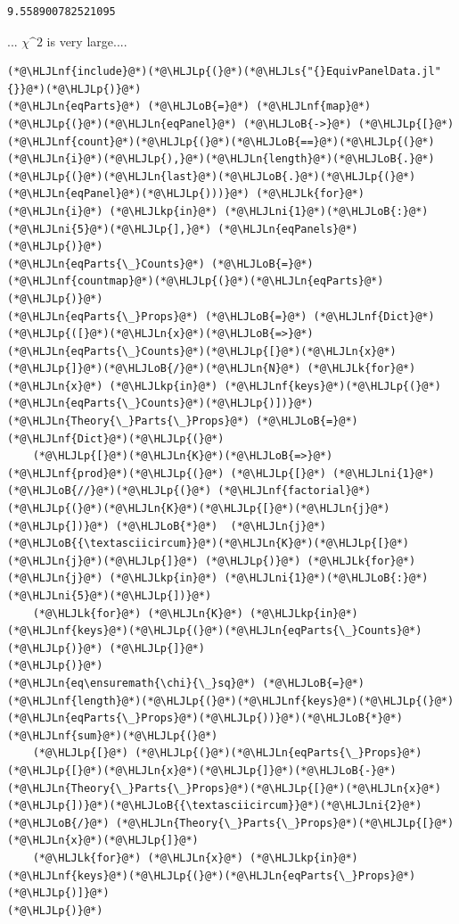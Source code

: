 \documentclass[12pt,a4paper]{article}
\newcommand{\HLJLk}[1]{\textcolor[RGB]{148,91,176}{\textbf{#1}}}
\newcommand{\HLJLkp}[1]{\textcolor[RGB]{148,91,176}{\textbf{#1}}}
\newcommand{\HLJLn}[1]{#1}
\newcommand{\HLJLnf}[1]{\textcolor[RGB]{66,102,213}{#1}}
\newcommand{\HLJLs}[1]{\textcolor[RGB]{201,61,57}{#1}}
\newcommand{\HLJLni}[1]{\textcolor[RGB]{59,151,46}{#1}}
\newcommand{\HLJLoB}[1]{\textcolor[RGB]{102,102,102}{\textbf{#1}}}
\newcommand{\HLJLp}[1]{#1}
\begin{document}
\begin{lstlisting}
9.558900782521095
\end{lstlisting}


... \ensuremath{\chi}\ensuremath{\^2} is very large....


\begin{lstlisting}
(*@\HLJLnf{include}@*)(*@\HLJLp{(}@*)(*@\HLJLs{"{}EquivPanelData.jl"{}}@*)(*@\HLJLp{)}@*)
(*@\HLJLn{eqParts}@*) (*@\HLJLoB{=}@*) (*@\HLJLnf{map}@*)(*@\HLJLp{(}@*)(*@\HLJLn{eqPanel}@*) (*@\HLJLoB{->}@*) (*@\HLJLp{[}@*)(*@\HLJLnf{count}@*)(*@\HLJLp{(}@*)(*@\HLJLoB{==}@*)(*@\HLJLp{(}@*)(*@\HLJLn{i}@*)(*@\HLJLp{),}@*)(*@\HLJLn{length}@*)(*@\HLJLoB{.}@*)(*@\HLJLp{(}@*)(*@\HLJLn{last}@*)(*@\HLJLoB{.}@*)(*@\HLJLp{(}@*)(*@\HLJLn{eqPanel}@*)(*@\HLJLp{)))}@*) (*@\HLJLk{for}@*) (*@\HLJLn{i}@*) (*@\HLJLkp{in}@*) (*@\HLJLni{1}@*)(*@\HLJLoB{:}@*)(*@\HLJLni{5}@*)(*@\HLJLp{],}@*) (*@\HLJLn{eqPanels}@*) (*@\HLJLp{)}@*)
(*@\HLJLn{eqParts{\_}Counts}@*) (*@\HLJLoB{=}@*) (*@\HLJLnf{countmap}@*)(*@\HLJLp{(}@*)(*@\HLJLn{eqParts}@*)(*@\HLJLp{)}@*)
(*@\HLJLn{eqParts{\_}Props}@*) (*@\HLJLoB{=}@*) (*@\HLJLnf{Dict}@*)(*@\HLJLp{([}@*)(*@\HLJLn{x}@*)(*@\HLJLoB{=>}@*)(*@\HLJLn{eqParts{\_}Counts}@*)(*@\HLJLp{[}@*)(*@\HLJLn{x}@*)(*@\HLJLp{]}@*)(*@\HLJLoB{/}@*)(*@\HLJLn{N}@*) (*@\HLJLk{for}@*) (*@\HLJLn{x}@*) (*@\HLJLkp{in}@*) (*@\HLJLnf{keys}@*)(*@\HLJLp{(}@*)(*@\HLJLn{eqParts{\_}Counts}@*)(*@\HLJLp{)])}@*)
(*@\HLJLn{Theory{\_}Parts{\_}Props}@*) (*@\HLJLoB{=}@*) (*@\HLJLnf{Dict}@*)(*@\HLJLp{(}@*)
	(*@\HLJLp{[}@*)(*@\HLJLn{K}@*)(*@\HLJLoB{=>}@*) (*@\HLJLnf{prod}@*)(*@\HLJLp{(}@*) (*@\HLJLp{[}@*) (*@\HLJLni{1}@*)(*@\HLJLoB{//}@*)(*@\HLJLp{(}@*) (*@\HLJLnf{factorial}@*)(*@\HLJLp{(}@*)(*@\HLJLn{K}@*)(*@\HLJLp{[}@*)(*@\HLJLn{j}@*)(*@\HLJLp{])}@*) (*@\HLJLoB{*}@*)  (*@\HLJLn{j}@*)(*@\HLJLoB{{\textasciicircum}}@*)(*@\HLJLn{K}@*)(*@\HLJLp{[}@*)(*@\HLJLn{j}@*)(*@\HLJLp{]}@*) (*@\HLJLp{)}@*) (*@\HLJLk{for}@*) (*@\HLJLn{j}@*) (*@\HLJLkp{in}@*) (*@\HLJLni{1}@*)(*@\HLJLoB{:}@*)(*@\HLJLni{5}@*)(*@\HLJLp{])}@*) 
	(*@\HLJLk{for}@*) (*@\HLJLn{K}@*) (*@\HLJLkp{in}@*) (*@\HLJLnf{keys}@*)(*@\HLJLp{(}@*)(*@\HLJLn{eqParts{\_}Counts}@*)(*@\HLJLp{)}@*) (*@\HLJLp{]}@*)
(*@\HLJLp{)}@*)
(*@\HLJLn{eq\ensuremath{\chi}{\_}sq}@*) (*@\HLJLoB{=}@*) (*@\HLJLnf{length}@*)(*@\HLJLp{(}@*)(*@\HLJLnf{keys}@*)(*@\HLJLp{(}@*)(*@\HLJLn{eqParts{\_}Props}@*)(*@\HLJLp{))}@*)(*@\HLJLoB{*}@*)(*@\HLJLnf{sum}@*)(*@\HLJLp{(}@*)
	(*@\HLJLp{[}@*) (*@\HLJLp{(}@*)(*@\HLJLn{eqParts{\_}Props}@*)(*@\HLJLp{[}@*)(*@\HLJLn{x}@*)(*@\HLJLp{]}@*)(*@\HLJLoB{-}@*)(*@\HLJLn{Theory{\_}Parts{\_}Props}@*)(*@\HLJLp{[}@*)(*@\HLJLn{x}@*)(*@\HLJLp{])}@*)(*@\HLJLoB{{\textasciicircum}}@*)(*@\HLJLni{2}@*) (*@\HLJLoB{/}@*) (*@\HLJLn{Theory{\_}Parts{\_}Props}@*)(*@\HLJLp{[}@*)(*@\HLJLn{x}@*)(*@\HLJLp{]}@*)
	(*@\HLJLk{for}@*) (*@\HLJLn{x}@*) (*@\HLJLkp{in}@*) (*@\HLJLnf{keys}@*)(*@\HLJLp{(}@*)(*@\HLJLn{eqParts{\_}Props}@*)(*@\HLJLp{)]}@*)
(*@\HLJLp{)}@*)
\end{lstlisting}
\end{document}
